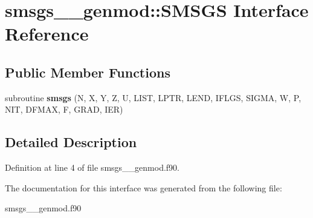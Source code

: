 \hypertarget{interfacesmsgs____genmod_1_1_s_m_s_g_s}{\section{smsgs\+\_\+\+\_\+genmod\+:\+:S\+M\+S\+G\+S Interface Reference}
\label{interfacesmsgs____genmod_1_1_s_m_s_g_s}
}
\subsection*{Public Member Functions}
\begin{DoxyCompactItemize}
\item 
\hypertarget{interfacesmsgs____genmod_1_1_s_m_s_g_s_ac7580bf63fdea3cac3c489e50702306c}{subroutine {\bfseries smsgs} (N, X, Y, Z, U, L\+I\+S\+T, L\+P\+T\+R, L\+E\+N\+D, I\+F\+L\+G\+S, S\+I\+G\+M\+A, W, P, N\+I\+T, D\+F\+M\+A\+X, F, G\+R\+A\+D, I\+E\+R)}\label{interfacesmsgs____genmod_1_1_s_m_s_g_s_ac7580bf63fdea3cac3c489e50702306c}

\end{DoxyCompactItemize}


\subsection{Detailed Description}


Definition at line 4 of file smsgs\+\_\+\+\_\+genmod.\+f90.



The documentation for this interface was generated from the following file\+:\begin{DoxyCompactItemize}
\item 
smsgs\+\_\+\+\_\+genmod.\+f90\end{DoxyCompactItemize}
